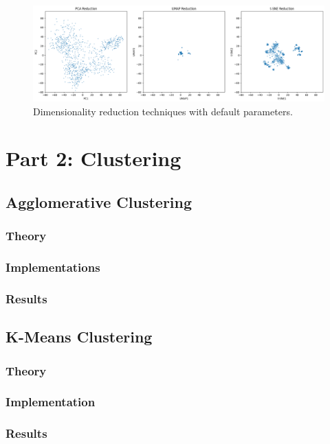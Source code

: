 \documentclass[12pt]{article}
\begin{document}
\begin{figure}
    \centering
    \includegraphics[width=\textwidth]{Images/default_dimred.png}
    \caption{Dimensionality reduction techniques with default parameters.}
    \label{fig:default_dimred}
\end{figure}

\section{Part 2: Clustering}
\subsection{Agglomerative Clustering}
\subsubsection{Theory}

\subsubsection{Implementations}

\subsubsection{Results}

\subsection{K-Means Clustering}
\subsubsection{Theory}

\subsubsection{Implementation}

\subsubsection{Results}
\end{document}
